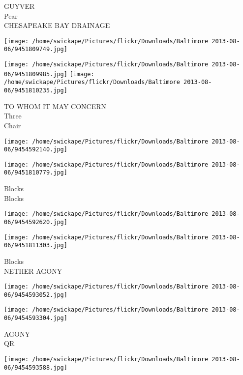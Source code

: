 \documentclass[10pt,letterpaper]{article}
\begin{document}
GUYVER\\
Pear\\
CHESAPEAKE BAY DRAINAGE\\
\pagebreak

\texttt{[image: /home/swickape/Pictures/flickr/Downloads/Baltimore 2013-08-06/9451809749.jpg]}

\vspace{0.25in}
\texttt{[image: /home/swickape/Pictures/flickr/Downloads/Baltimore 2013-08-06/9451809985.jpg]}
\texttt{[image: /home/swickape/Pictures/flickr/Downloads/Baltimore 2013-08-06/9451810235.jpg]}

TO WHOM IT MAY CONCERN\\
Three\\
Chair\\
\pagebreak

\texttt{[image: /home/swickape/Pictures/flickr/Downloads/Baltimore 2013-08-06/9454592140.jpg]}

\vspace{0.25in}
\texttt{[image: /home/swickape/Pictures/flickr/Downloads/Baltimore 2013-08-06/9451810779.jpg]}

Blocks\\
Blocks\\
\pagebreak

\texttt{[image: /home/swickape/Pictures/flickr/Downloads/Baltimore 2013-08-06/9454592620.jpg]}

\vspace{0.25in}
\texttt{[image: /home/swickape/Pictures/flickr/Downloads/Baltimore 2013-08-06/9451811303.jpg]}

Blocks\\
NETHER AGONY\\
\pagebreak

\texttt{[image: /home/swickape/Pictures/flickr/Downloads/Baltimore 2013-08-06/9454593052.jpg]}

\vspace{0.25in}
\texttt{[image: /home/swickape/Pictures/flickr/Downloads/Baltimore 2013-08-06/9454593304.jpg]}

AGONY\\
QR\\
\pagebreak

\texttt{[image: /home/swickape/Pictures/flickr/Downloads/Baltimore 2013-08-06/9454593588.jpg]}
\end{document}
